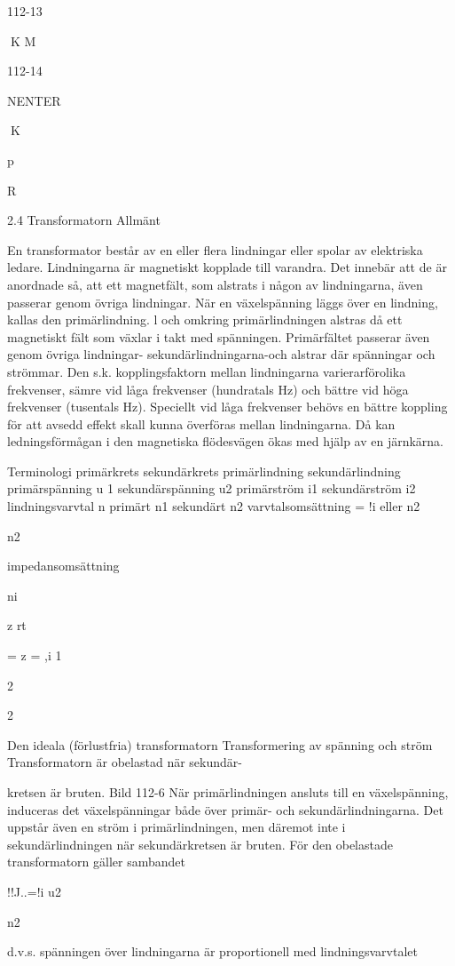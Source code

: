{112-13

K M

112-14

NENTER

K

p

R

2.4 Transformatorn
Allmänt

En transformator består av en eller flera
lindningar eller spolar av elektriska ledare.
Lindningarna är magnetiskt kopplade till varandra. Det innebär att de är anordnade så,
att ett magnetfält, som alstrats i någon av
lindningarna, även passerar genom övriga
lindningar.
När en växelspänning läggs över en lindning, kallas den primärlindning. l och omkring primärlindningen alstras då ett magnetiskt fält som växlar i takt med spänningen.
Primärfältet passerar även genom övriga
lindningar- sekundärlindningarna-och alstrar där spänningar och strömmar.
Den s.k. kopplingsfaktorn mellan lindningarna varierarförolika frekvenser, sämre
vid låga frekvenser (hundratals Hz) och bättre vid höga frekvenser (tusentals Hz). Speciellt vid låga frekvenser behövs en bättre
koppling för att avsedd effekt skall kunna
överföras mellan lindningarna. Då kan ledningsförmågan i den magnetiska flödesvägen ökas med hjälp av en järnkärna.

Terminologi
primärkrets
sekundärkrets
primärlindning
sekundärlindning
primärspänning u 1 sekundärspänning u2
primärström i1
sekundärström i2
lindningsvarvtal n primärt n1 sekundärt n2
varvtalsomsättning = !i eller n2

n2

impedansomsättning

ni

z rt

= z = ,i
1

2

2

Den ideala (förlustfria) transformatorn
Transformering av spänning och ström
Transformatorn är obelastad när sekundär-

kretsen är bruten.
Bild 112-6
När primärlindningen ansluts till en växelspänning, induceras det växelspänningar
både över primär- och sekundärlindningarna. Det uppstår även en ström i primärlindningen, men däremot inte i sekundärlindningen när sekundärkretsen är bruten. För
den obelastade transformatorn gäller sambandet

!!J..=!i
u2

n2

d.v.s. spänningen över lindningarna är proportionell med lindningsvarvtalet

}
